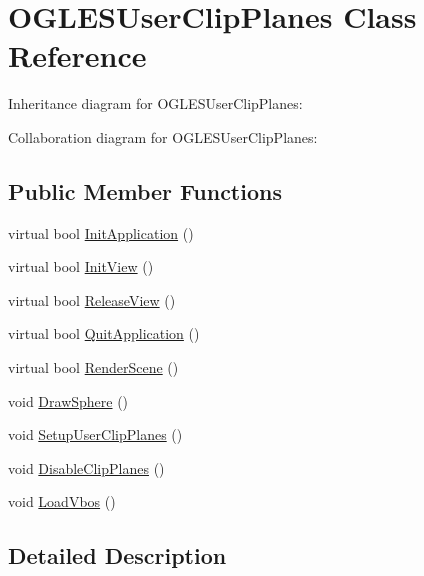 \hypertarget{class_o_g_l_e_s_user_clip_planes}{\section{O\+G\+L\+E\+S\+User\+Clip\+Planes Class Reference}
\label{class_o_g_l_e_s_user_clip_planes}
}


Inheritance diagram for O\+G\+L\+E\+S\+User\+Clip\+Planes\+:


Collaboration diagram for O\+G\+L\+E\+S\+User\+Clip\+Planes\+:
\subsection*{Public Member Functions}
\begin{DoxyCompactItemize}
\item 
virtual bool \hyperlink{class_o_g_l_e_s_user_clip_planes_af971d2e7e9e9d8d65aac3495d5bc16ac}{Init\+Application} ()
\item 
virtual bool \hyperlink{class_o_g_l_e_s_user_clip_planes_a9b2e21b8248b7aaf4cbef8ef3ae5415b}{Init\+View} ()
\item 
virtual bool \hyperlink{class_o_g_l_e_s_user_clip_planes_a1bdc831a31cbfd57a4896a24c920bdba}{Release\+View} ()
\item 
virtual bool \hyperlink{class_o_g_l_e_s_user_clip_planes_ad2a817cf78f66b0037e54a3dfc283ec2}{Quit\+Application} ()
\item 
virtual bool \hyperlink{class_o_g_l_e_s_user_clip_planes_a246dafc4ebabda78433e8edff0ee7ef0}{Render\+Scene} ()
\item 
void \hyperlink{class_o_g_l_e_s_user_clip_planes_afe7e0e5cb8633e79240636e62eb7343b}{Draw\+Sphere} ()
\item 
void \hyperlink{class_o_g_l_e_s_user_clip_planes_a02daa8050075498e58d8a37ea9d0e1c2}{Setup\+User\+Clip\+Planes} ()
\item 
void \hyperlink{class_o_g_l_e_s_user_clip_planes_a399f3649f9372afd4cf43ae804af6b36}{Disable\+Clip\+Planes} ()
\item 
void \hyperlink{class_o_g_l_e_s_user_clip_planes_a02410cf6b6e0d1516a531b306fbf548a}{Load\+Vbos} ()
\end{DoxyCompactItemize}


\subsection{Detailed Description}


